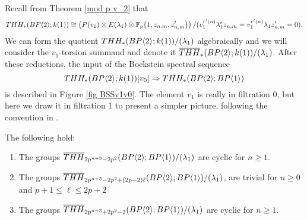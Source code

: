 Recall from Theorem \ref{mod p v_2} that 
\[ THH_*(BP\langle 2 \rangle;k(1))\cong \left ( P(v_1)\otimes E(\lambda_1)\otimes \mathbb{F}_p\{1, z_{n,m} ,z_{n,m}^{\prime} \} \right )/(v_1^{r^{\prime}(n)}\lambda_1^{\epsilon}z_{n,m}=v_1^{r^{\prime}(n)}\lambda_1z_{n,m}^{\prime}=0).\]
We can form the quotient 
$THH_*(BP\langle 2 \rangle;k(1))/(\lambda_1)$ algebraically and we will consider the $v_1$-torsion summand and denote it $\overline{THH}_*(BP\langle 2 \rangle;k(1))/(\lambda_1)$. After these reductions, the input of the Bockstein spectral sequence 
\[ THH_*(BP\langle 2 \rangle;k(1))[v_0]\Rightarrow THH_*(BP\langle 2 \rangle;BP\langle 1 \rangle) \]
is described in Figure \ref{fig BSSv1v0}. The element $v_1$ is really in filtration $0$, but here we draw it in filtration $1$ to present a simpler picture, following the convention in \cite{AHL}.

\begin{lem}
The following hold:
\begin{enumerate}
\item The groups $\overline{THH}_{2p^{n+3}-2p^2}(BP\langle 2 \rangle;BP\langle 1 \rangle)/(\lambda_1)$ are cyclic for $n\ge 1$.
\item The groups $\overline{THH}_{2p^{n+3}-2p^2+(2p-2)\ell}(BP\langle 2 \rangle;BP\langle 1 \rangle)/(\lambda_1)$, are trivial for $n\ge 0$ and $p+1 \le \ell \le 2p+2$
\item The groups  $\overline{THH}_{2p^{n+3}+2p^2-2}(BP\langle 2 \rangle;BP\langle 1 \rangle)/(\lambda_1)$ are cyclic for $n\ge 1$.
\end{enumerate}
\end{lem}
